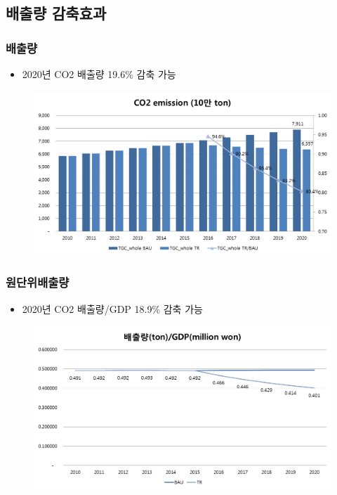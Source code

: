 \documentclass[10pt,compress,slidetop,%
			   hyperref={unicode},xcolor={svgnames},%
			   t]{beamer}
\begin{document}
\subsection{배출량 감축효과}
\begin{frame}
	\frametitle{배출량}
	\begin{itemize}
		\item {2020년 CO2 배출량 19.6\% 감축 가능}
	\end{itemize}
	\begin{figure}
		\centering
		\includegraphics[width=1.00\textwidth]{GHG.png}
	\end{figure}
\end{frame}

\begin{frame}
	\frametitle{원단위배출량}
	\begin{itemize}
		\item {2020년 CO2 배출량/GDP 18.9\% 감축 가능}
	\end{itemize}
	\begin{figure}
		\centering
		\includegraphics[width=1.00\textwidth]{GHGperOutput.png}
	\end{figure}
\end{frame}
\end{document}
